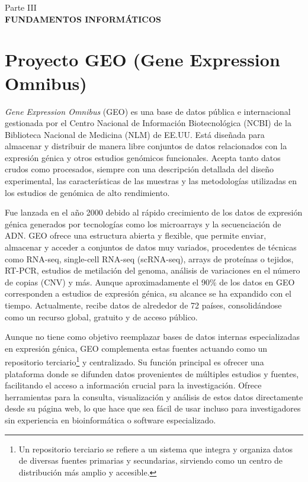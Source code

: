 \newpage
\thispagestyle{empty}
\vspace*{\fill}
\begin{center}
    \large Parte III \\
    \vspace{0.5cm}           
    \LARGE \textbf{FUNDAMENTOS INFORMÁTICOS}
\end{center}
\vspace*{\fill}
\newpage


\chapter{Proyecto GEO (Gene Expression Omnibus)}


\textit{Gene Expression Omnibus} (GEO) es una base de datos pública e internacional gestionada por el Centro Nacional de Información 
Biotecnológica (NCBI) de la Biblioteca Nacional de Medicina (NLM) de EE.UU.
Está diseñada para almacenar y distribuir de manera libre conjuntos de datos relacionados con la expresión génica y otros estudios 
genómicos funcionales. Acepta tanto datos crudos como procesados, siempre con una descripción detallada del 
diseño experimental, las características de las muestras y las metodologías utilizadas en los estudios de genómica de alto rendimiento. \newline

Fue lanzada en el año 2000 debido al rápido crecimiento de los datos de expresión génica generados por tecnologías como los microarrays y la secuenciación 
de ADN. GEO ofrece una estructura abierta y flexible, que permite enviar, almacenar y acceder a conjuntos de datos muy variados, procedentes de 
técnicas como RNA-seq, single-cell RNA-seq (scRNA-seq), arrays de proteínas o tejidos, RT-PCR, estudios de metilación del genoma, análisis de 
variaciones en el número de copias (CNV) y más. Aunque aproximadamente el 90\% de los datos en GEO corresponden a estudios de expresión génica, 
su alcance se ha expandido con el tiempo. Actualmente, recibe datos de alrededor de 72 países, consolidándose como un recurso global, gratuito 
y de acceso público. \newline

Aunque no tiene como objetivo reemplazar bases de datos internas especializadas en expresión génica, GEO complementa estas fuentes actuando como 
un repositorio terciario\footnote[1]{Un repositorio terciario se refiere a un sistema que integra y organiza datos de diversas 
fuentes primarias y secundarias, sirviendo como un centro de distribución más amplio y accesible.} y centralizado. Su función principal es ofrecer una plataforma 
donde se difunden datos provenientes de múltiples estudios y fuentes, facilitando el acceso a información crucial para la investigación. Ofrece herramientas 
para la consulta, visualización y análisis de estos datos directamente desde su página web, lo que hace que sea fácil de usar incluso para investigadores 
sin experiencia en bioinformática o software especializado.\newline

